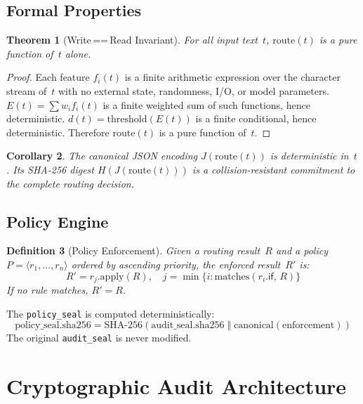 \documentclass[11pt,a4paper]{article}
\newtheorem{theorem}{Theorem}[section]
\newtheorem{corollary}[theorem]{Corollary}
\newtheorem{definition}[theorem]{Definition}
\begin{document}
\subsection{Formal Properties}

\begin{theorem}[Write\,==\,Read Invariant]
\label{thm:wwr}
For all input text~$t$, $\mathrm{route}(t)$ is a pure function of~$t$ alone.
\end{theorem}

\begin{proof}
Each feature $f_i(t)$ is a finite arithmetic expression over the character stream
of~$t$ with no external state, randomness, I/O, or model parameters. $E(t) = \sum
w_i f_i(t)$ is a finite weighted sum of such functions, hence deterministic.
$d(t) = \mathrm{threshold}(E(t))$ is a finite conditional, hence deterministic.
Therefore $\mathrm{route}(t)$ is a pure function of~$t$.
\end{proof}

\begin{corollary}
\label{cor:hash}
The canonical JSON encoding $J(\mathrm{route}(t))$ is deterministic in~$t$.
Its SHA-256 digest $H(J(\mathrm{route}(t)))$ is a collision-resistant commitment
to the complete routing decision.
\end{corollary}

\subsection{Policy Engine}
\label{sec:policy}

\begin{definition}[Policy Enforcement]
Given a routing result~$R$ and a policy $P = \langle r_1,\ldots,r_n\rangle$
ordered by ascending priority, the enforced result~$R'$ is:
\[
  R' = r_j.\mathrm{apply}(R), \quad
  j = \min\{i : \mathrm{matches}(r_i.\mathsf{if},\, R)\}
\]
If no rule matches, $R' = R$.
\end{definition}

The \texttt{policy\_seal} is computed deterministically:
\begin{equation}
  \text{policy\_seal.sha256} =
  \text{SHA-256}\!\left(
    \text{audit\_seal.sha256} \;\Vert\; \text{canonical}(\text{enforcement})
  \right)
\end{equation}
The original \texttt{audit\_seal} is never modified.

\section{Cryptographic Audit Architecture}
\label{sec:crypto}
\end{document}
